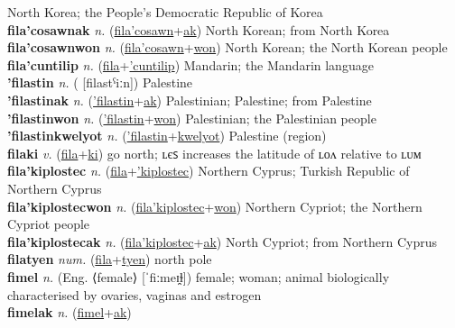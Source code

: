 North Korea; the People’s Democratic Republic of Korea \label{fila'cosawn} \\
\textbf{fila'cosawnak} \textit{n.} (\hyperref[fila'cosawn]{fila'cosawn}+\hyperref[ak]{ak})
North Korean; from North Korea \label{fila'cosawnak} \\
\textbf{fila'cosawnwon} \textit{n.} (\hyperref[fila'cosawn]{fila'cosawn}+\hyperref[won]{won})
North Korean; the North Korean people \label{fila'cosawnwon} \\
\textbf{fila'cuntilip} \textit{n.} (\hyperref[fila]{fila}+\hyperref['cuntilip]{'cuntilip})
Mandarin; the Mandarin language \label{fila'cuntilip} \\
\textbf{'filastin} \textit{n.} ( [filastˁiːn])
Palestine \label{'filastin} \\
\textbf{'filastinak} \textit{n.} (\hyperref['filastin]{'filastin}+\hyperref[ak]{ak})
Palestinian; Palestine; from Palestine \label{'filastinak} \\
\textbf{'filastinwon} \textit{n.} (\hyperref['filastin]{'filastin}+\hyperref[won]{won})
Palestinian; the Palestinian people \label{'filastinwon} \\
\textbf{'filastinkwelyot} \textit{n.} (\hyperref['filastin]{'filastin}+\hyperref[kwelyot]{kwelyot})
Palestine (region) \label{'filastinkwelyot} \\
\textbf{filaki} \textit{v.} (\hyperref[fila]{fila}+\hyperref[ki]{ki})
go north; ʟєꜱ increases the latitude of ʟᴏᴧ relative to ʟᴜᴍ \label{filaki} \\
\textbf{fila'kiplostec} \textit{n.} (\hyperref[fila]{fila}+\hyperref['kiplostec]{'kiplostec})
Northern Cyprus; Turkish Republic of Northern Cyprus \label{fila'kiplostec} \\
\textbf{fila'kiplostecwon} \textit{n.} (\hyperref[fila'kiplostec]{fila'kiplostec}+\hyperref[won]{won})
Northern Cypriot; the Northern Cypriot people \label{fila'kiplostecwon} \\
\textbf{fila'kiplostecak} \textit{n.} (\hyperref[fila'kiplostec]{fila'kiplostec}+\hyperref[ak]{ak})
North Cypriot; from Northern Cyprus \label{fila'kiplostecak} \\
\textbf{filatyen} \textit{num.} (\hyperref[fila]{fila}+\hyperref[tyen]{tyen})
north pole \label{filatyen} \\
\textbf{fimel} \textit{n.} (Eng. ⟨female⟩ [ˈfiːmeɪ̯ɫ])
female; woman; animal biologically characterised by ovaries, vaginas and estrogen \label{fimel} \\
\textbf{fimelak} \textit{n.} (\hyperref[fimel]{fimel}+\hyperref[ak]{ak})
